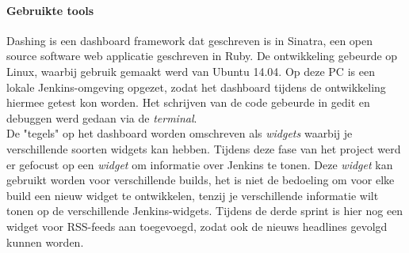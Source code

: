\documentclass[10pt,a4paper]{article}
\begin{document}
\paragraph{Gebruikte tools}
Dashing is een dashboard framework dat geschreven is in Sinatra, een open source software web applicatie geschreven in Ruby. De ontwikkeling gebeurde op Linux, waarbij gebruik gemaakt werd van Ubuntu 14.04. Op deze PC is een lokale Jenkins-omgeving opgezet, zodat het dashboard tijdens de ontwikkeling hiermee getest kon worden. Het schrijven van de code gebeurde in gedit en debuggen werd gedaan via de \textit{terminal}.\\
De "tegels" op het dashboard worden omschreven als \textit{widgets} waarbij je verschillende soorten widgets kan hebben. Tijdens deze fase van het project werd er gefocust op een \textit{widget} om informatie over Jenkins te tonen. Deze \textit{widget} kan gebruikt worden voor verschillende builds, het is niet de bedoeling om voor elke build een nieuw widget te ontwikkelen, tenzij je verschillende informatie wilt tonen op de verschillende Jenkins-widgets. Tijdens de derde sprint is hier nog een widget voor RSS-feeds aan toegevoegd, zodat ook de nieuws headlines  gevolgd kunnen worden.
\end{document}
